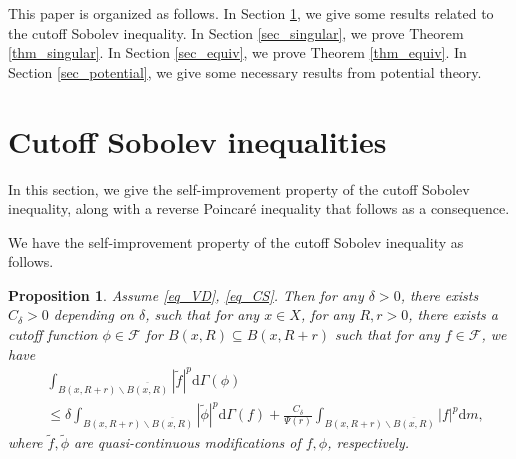 \documentclass[11pt,a4paper]{article}
\numberwithin{equation}{section}
\theoremstyle{plain}
\newtheorem{proposition}[theorem]{Proposition}
\theoremstyle{definition}
\begin{document}
This paper is organized as follows. In Section \ref{sec_CS}, we give some results related to the cutoff Sobolev inequality. In Section \ref{sec_singular}, we prove Theorem \ref{thm_singular}. In Section \ref{sec_equiv}, we prove Theorem \ref{thm_equiv}. In Section \ref{sec_potential}, we give some necessary results from potential theory.

\section{Cutoff Sobolev inequalities}\label{sec_CS}

In this section, we give the self-improvement property of the cutoff Sobolev inequality, along with a reverse Poincar\'e inequality that follows as a consequence.

We have the self-improvement property of the cutoff Sobolev inequality as follows.

\begin{proposition}\label{prop_CS_self}
Assume \ref{eq_VD}, \ref{eq_CS}. Then for any $\delta>0$, there exists $C_\delta>0$ depending on $\delta$, such that for any $x\in X$, for any $R, r>0$, there exists a cutoff function $\phi\in\mathcal{F}$ for $B(x,R)\subseteq B(x,R+r)$ such that for any $f\in\mathcal{F}$, we have
\begin{align}
&\int_{B(x,R+r)\backslash\overline{B(x,R)}}|\widetilde{f}|^p \mathrm{d}\Gamma(\phi)\nonumber\\
&\le\delta\int_{B(x,R+r)\backslash\overline{B(x,R)}}|\widetilde{\phi}|^p\mathrm{d}\Gamma(f)+\frac{C_\delta}{\Psi(r)}\int_{B(x,R+r)\backslash\overline{B(x,R)}}|f|^p\mathrm{d} m,\label{eq_CS_self}
\end{align}
where $\widetilde{f}, \widetilde{\phi}$ are quasi-continuous modifications of $f, \phi$, respectively.
\end{proposition}
\end{document}
